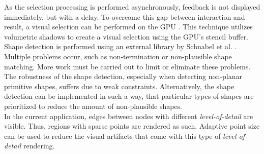 As the selection processing is performed asynchronously, feedback is not displayed immediately, but with a delay. To overcome this gap between interaction and result, a visual selection can be performed on the GPU \cite{rainer2016visual}. This technique utilizes volumetric shadows to create a visual selection using the GPU's stencil buffer. 
\\

Shape detection is performed using an external library by Schnabel et al. \cite{schnabel-2007-software}. Multiple problems occur, such as non-termination or non-plausible shape matching. More work must be carried out to limit or eliminate these problems. The robustness of the shape detection, especially when detecting non-planar primitive shapes, suffers due to weak constraints. Alternatively, the shape detection can be implemented in such a way, that particular types of shapes are prioritized to reduce the amount of non-plausible shapes. 
\\

In the current application, edges between nodes with different \textit{level-of-detail} are visible. Thus, regions with sparse points are rendered as such. Adaptive point size can be used to reduce the visual artifacts that come with this type of \textit{level-of-detail} rendering. 
